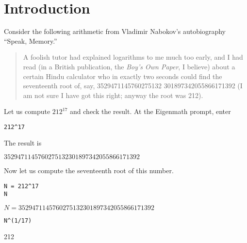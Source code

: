 \section{Introduction}

\noindent
Consider the following arithmetic from Vladimir Nabokov's autobiography ``Speak, Memory.''

\begin{quote}
A foolish tutor had explained logarithms to me much too early, and I had
read (in a British publication, the {\it Boy's Own Paper}, I believe)
about a certain Hindu calculator who in exactly two seconds could find the
seventeenth root of, say,
3529471145760275132 301897342055866171392
(I am not sure I have got this right; anyway the root was 212).
\end{quote}

\noindent
Let us compute $212^{17}$ and check the result.
At the Eigenmath prompt, enter

{\color{blue}
\begin{verbatim}
212^17
\end{verbatim}
}

\noindent
The result is

\bigskip
\noindent
$3529471145760275132301897342055866171392$

\bigskip
\noindent
Now let us compute the seventeenth root of this number.
{\color{blue}
\begin{verbatim}
N = 212^17
N
\end{verbatim}
}
$N=3529471145760275132301897342055866171392$
{\color{blue}
\begin{verbatim}
N^(1/17)
\end{verbatim}
}
212
